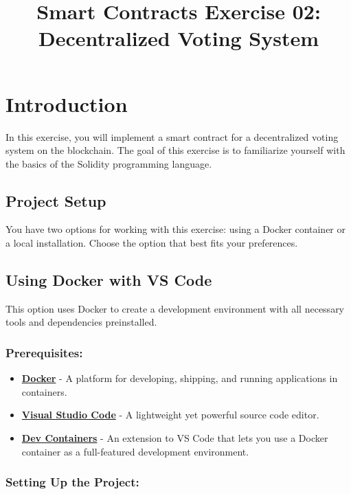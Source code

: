 \documentclass[12pt]{article}
\title{Smart Contracts Exercise 02: \\ Decentralized Voting System}
\author{}
\date{}
\begin{document}
\maketitle
\section{Introduction}

In this exercise, you will implement a smart contract for a decentralized voting system on the blockchain. The goal of this exercise is to familiarize yourself with the basics of the Solidity programming language.

\subsection*{Project Setup}

You have two options for working with this exercise: using a Docker container or a local installation. Choose the option that best fits your preferences.

\subsection{Using Docker with VS Code}

This option uses Docker to create a development environment with all necessary tools and dependencies preinstalled.

\subsubsection*{Prerequisites:}

\begin{itemize}
    \item \textbf{\href{https://www.docker.com/products/docker-desktop}{Docker}} - A platform for developing, shipping, and running applications in containers.
    \item \textbf{\href{https://code.visualstudio.com/}{Visual Studio Code}} - A lightweight yet powerful source code editor.
    \item \textbf{\href{https://marketplace.visualstudio.com/items?itemName=ms-vscode-remote.remote-containers}{Dev Containers}} - An extension to VS Code that lets you use a Docker container as a full-featured development environment.
\end{itemize}

\subsubsection*{Setting Up the Project:}
\end{document}
